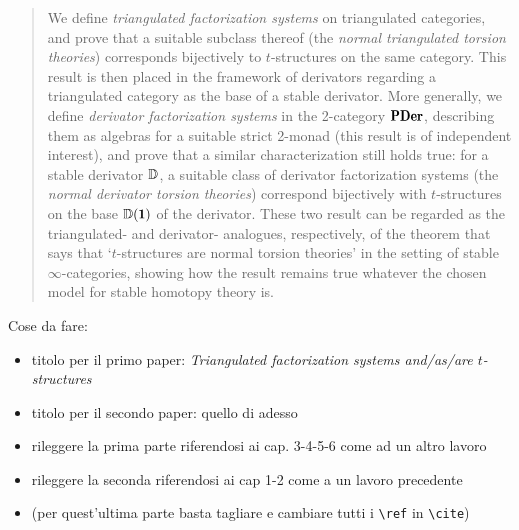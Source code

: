\documentclass[a4paper,10pt]{amsart}
\begin{document}
\maketitle
\begin{abstract}
We define \emph{triangulated factorization systems} on triangulated categories, and prove that a suitable subclass thereof (the \emph{normal triangulated torsion theories}) corresponds bijectively to $t$-structures on the same category.
This result is then placed in the framework of derivators regarding a triangulated category as the base of a stable derivator. More generally, we define \emph{derivator factorization systems} in the 2-category $\PDer$, describing them as algebras for a suitable strict 2-monad (this result is of independent interest), and prove that a similar characterization still holds true: for a stable derivator $\mathbb{D}$, a suitable class of derivator factorization systems (the \emph{normal derivator torsion theories}) correspond bijectively with $t$-structures on the base $\D(\uno)$ of the derivator.
These two result can be regarded as the triangulated- and derivator- analogues, respectively, of the theorem that says that `$t$-structures are normal torsion theories' in the setting of stable $\infty$-categories, showing how the result remains true whatever the chosen model for stable homotopy theory is.
\end{abstract}

{\color{red} Cose da fare:
\begin{itemize}
\item titolo per il primo paper: \emph{Triangulated factorization systems and/as/are $t$-structures}
\item titolo per il secondo paper: quello di adesso
\item rileggere la prima parte riferendosi ai cap. 3-4-5-6 come ad un altro lavoro
\item rileggere la seconda riferendosi ai cap 1-2 come a un lavoro precedente
\item (per quest'ultima parte basta tagliare e cambiare tutti i \verb|\ref| in \verb|\cite|)
\end{itemize}
}

\tableofcontents
% 
% 
% 
%







\end{document}
